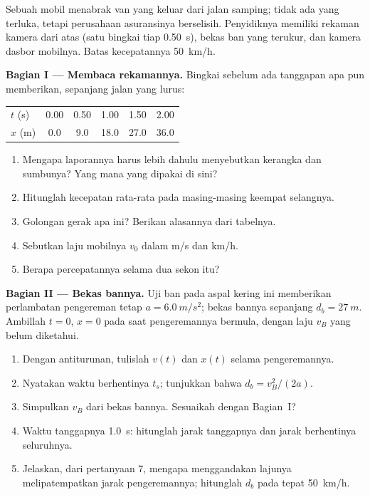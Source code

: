 \begin{problem}
\label{pb:g12:kinematics-2d:1}
Sebuah mobil menabrak van yang keluar dari jalan samping; tidak ada yang
terluka, tetapi perusahaan asuransinya berselisih. Penyidiknya memiliki
rekaman kamera dari atas (satu bingkai tiap \qty{0.50}{s}), bekas ban
yang terukur, dan kamera dasbor mobilnya. Batas kecepatannya
\qty{50}{km/h}.

\medskip
\noindent\textbf{Bagian I --- Membaca rekamannya.}
Bingkai sebelum ada tanggapan apa pun memberikan, sepanjang jalan yang
lurus:
\begin{center}\small
\begin{tabular}{lccccc}
$t$ (\unit{s}) & 0.00 & 0.50 & 1.00 & 1.50 & 2.00\\
$x$ (\unit{m}) & 0.0 & 9.0 & 18.0 & 27.0 & 36.0
\end{tabular}
\end{center}
\begin{enumerate}
  \item Mengapa laporannya harus lebih dahulu menyebutkan kerangka dan
        sumbunya? Yang mana yang dipakai di sini?
  \item Hitunglah kecepatan rata-rata pada masing-masing keempat
        selangnya.
  \item Golongan gerak apa ini? Berikan alasannya dari tabelnya.
  \item Sebutkan laju mobilnya $v_0$ dalam \unit{m/s} dan \unit{km/h}.
  \item Berapa percepatannya selama dua sekon itu?
\end{enumerate}

\medskip
\noindent\textbf{Bagian II --- Bekas bannya.}
Uji ban pada aspal kering ini memberikan perlambatan pengereman tetap
$a = \qty{6.0}{m/s^2}$; bekas bannya sepanjang $d_b = \qty{27}{m}$.
Ambillah $t = 0$, $x = 0$ pada saat pengeremannya bermula, dengan laju
$v_B$ yang belum diketahui.
\begin{enumerate}[resume]
  \item Dengan antiturunan, tulislah $v(t)$ dan $x(t)$ selama
        pengeremannya.
  \item Nyatakan waktu berhentinya $t_s$; tunjukkan bahwa
        $d_b = v_B^2/(2a)$.
  \item Simpulkan $v_B$ dari bekas bannya. Sesuaikah dengan Bagian~I?
  \item Waktu tanggapnya \qty{1.0}{s}: hitunglah jarak tanggapnya dan
        jarak berhentinya seluruhnya.
  \item Jelaskan, dari pertanyaan 7, mengapa menggandakan lajunya
        melipatempatkan jarak pengeremannya; hitunglah $d_b$ pada tepat
        \qty{50}{km/h}.
\end{enumerate}


\end{problem}
